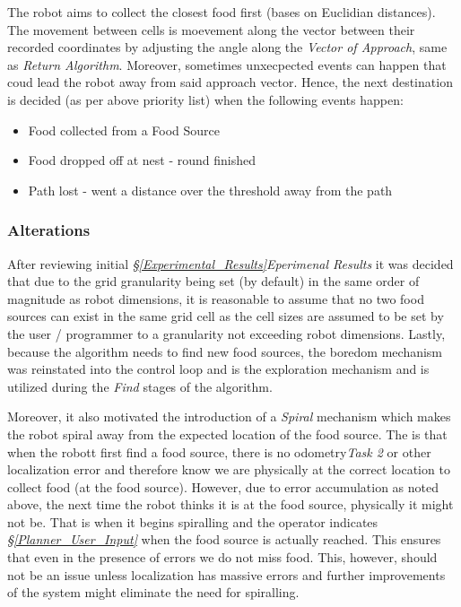 \documentclass[11pt, a4paper]{article}
\begin{document}
The robot aims to collect the closest food first (bases on Euclidian distances). The movement between cells is moevement along the vector between their recorded coordinates by adjusting the angle along the \textit{Vector of Approach}, same as \textit{Return Algorithm}\cite{task2_report}. Moreover, sometimes unxecpected events can happen that coud lead the robot away from said approach vector. Hence, the next destination is decided (as per above priority list) when the following events happen:

\begin{itemize}

	\item Food collected from a Food Source
	\item Food dropped off at nest - round finished
	\item Path lost - went a distance over the threshold away from the path

\end{itemize}

\subsubsection{Alterations}
\label{Planner_Algorithm_Alterations}

After reviewing initial \textit{\S\ref{Experimental_Results}Eperimenal Results} it was decided that due to the grid granularity being set (by default) in the same order of magnitude as robot dimensions, it is reasonable to assume that no two food sources can exist in the same grid cell as the cell sizes are assumed to be set by the user / programmer to a granularity not exceeding robot dimensions. Lastly, because the algorithm needs to find new food sources, the boredom mechanism \cite{task1_report} was reinstated into the control loop and is the exploration mechanism and is utilized during the \textit{Find} stages of the algorithm. 

Moreover, it also motivated the introduction of a \textit{Spiral} mechanism which makes the robot spiral away from the expected location of the food source. The is that when the robott first find a food source, there is no odometry\textit{Task 2}\cite{task2_report} or other localization error and therefore know we are physically at the correct location to collect food (at the food source). However, due to error accumulation as noted above, the next time the robot thinks it is at the food source, physically it might not be. That is when it begins spiralling and the operator indicates \textit{\S\ref{Planner_User_Input}}  when the food source is actually reached. This ensures that even in the presence of errors we do not miss food. This, however, should not be an issue unless localization has massive errors and further improvements of the system might eliminate the need for spiralling. 
\end{document}
